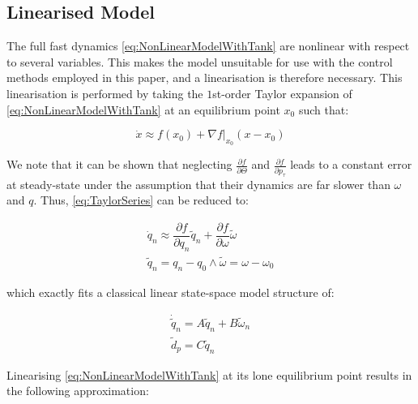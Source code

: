 \subsection{Linearised Model}

The full fast dynamics \cref{eq:NonLinearModelWithTank} are nonlinear with respect to several variables. This makes the model unsuitable for use with the control methods employed in this paper, and a linearisation is therefore necessary. This linearisation is performed by taking the $1$st-order Taylor expansion of \cref{eq:NonLinearModelWithTank} at an equilibrium point $x_0$ such that:

\begin{equation}\label{eq:TaylorSeries}
	\dot{x} \approx f(x_0) + \nabla f\bigg\rvert_{x_0} (x-x_0)
\end{equation}

We note that it can be shown that neglecting $\frac{\partial f}{\partial \Theta}$ and $\frac{\partial f}{\partial p_\tau}$ leads to a constant error at steady-state under the assumption that their dynamics are far slower than $\omega$ and $q$. Thus, \cref{eq:TaylorSeries} can be reduced to:

\begin{equation}\label{eq:TaylorSeriesSimple}
\begin{gathered}
	\dot{q}_n \approx \dfrac{\partial f}{\partial q_n} \tilde{q}_n + \dfrac{\partial f}{\partial \omega} \tilde{\omega} \\
	\tilde{q}_n = q_n-q_0 \wedge \tilde{\omega} = \omega-\omega_0
\end{gathered}
\end{equation}

which exactly fits a classical linear state-space model structure of:

\begin{equation}\label{eq:}
	\begin{gathered}
		\dot{\tilde{q}}_n = A\tilde{q}_n + B \tilde{\omega}_n \\
		\tilde{d}_p = C \tilde{q}_n
	\end{gathered}
\end{equation}

Linearising \cref{eq:NonLinearModelWithTank} at its lone equilibrium point results in the following approximation:

